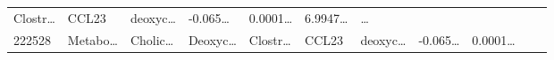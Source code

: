 \documentclass[
]{article}
\begin{document}
\begin{longtable}[]{@{}lllllllllll@{}}
\begin{minipage}[t]{0.07\columnwidth}
Clostr\ldots{}\strut
\end{minipage} & \begin{minipage}[t]{0.07\columnwidth}\raggedright
CCL23\strut
\end{minipage} & \begin{minipage}[t]{0.09\columnwidth}\raggedright
deoxyc\ldots{}\strut
\end{minipage} & \begin{minipage}[t]{0.07\columnwidth}\raggedright
-0.065\ldots{}\strut
\end{minipage} & \begin{minipage}[t]{0.07\columnwidth}\raggedright
0.0001\ldots{}\strut
\end{minipage} & \begin{minipage}[t]{0.07\columnwidth}\raggedright
6.9947\ldots{}\strut
\end{minipage} & \begin{minipage}[t]{0.03\columnwidth}\raggedright
\ldots{}\strut
\end{minipage}\tabularnewline
\begin{minipage}[t]{0.05\columnwidth}\raggedright
222528\strut
\end{minipage} & \begin{minipage}[t]{0.07\columnwidth}\raggedright
Metabo\ldots{}\strut
\end{minipage} & \begin{minipage}[t]{0.07\columnwidth}\raggedright
Cholic\ldots{}\strut
\end{minipage} & \begin{minipage}[t]{0.09\columnwidth}\raggedright
Deoxyc\ldots{}\strut
\end{minipage} & \begin{minipage}[t]{0.07\columnwidth}\raggedright
Clostr\ldots{}\strut
\end{minipage} & \begin{minipage}[t]{0.07\columnwidth}\raggedright
CCL23\strut
\end{minipage} & \begin{minipage}[t]{0.09\columnwidth}\raggedright
deoxyc\ldots{}\strut
\end{minipage} & \begin{minipage}[t]{0.07\columnwidth}\raggedright
-0.065\ldots{}\strut
\end{minipage} & \begin{minipage}[t]{0.07\columnwidth}\raggedright
0.0001\ldots{}\strut
\end{minipage} & \begin{minipage}[t]{0.07\columnwidth}\raggedright

\end{minipage}
\end{longtable}
\end{document}
